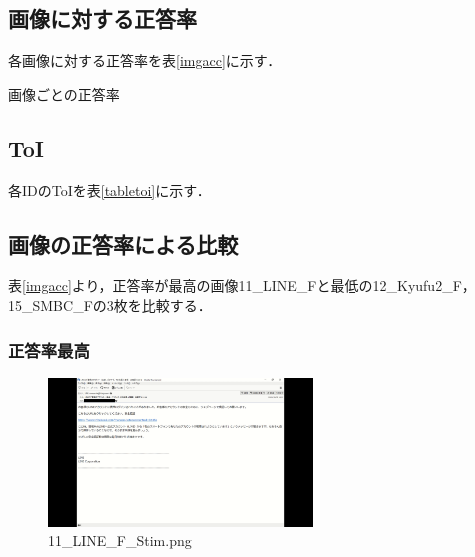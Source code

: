 \documentclass[a4paper,11pt]{ltjsreport}
\begin{document}
\subsection{画像に対する正答率}
各画像に対する正答率を表\ref{imgacc}に示す．
\begin{table}[H]
	\centering
	\caption{画像ごとの正答率\label{imgacc}}
\end{table}

\subsection{ToI}
各IDのToIを表\ref{tabletoi}に示す．
\begin{table}[H]
	\centering
	\caption{Time of Interest\label{tabletoi}}
\end{table}

\subsection{画像の正答率による比較}
\label{sec:imgacccompare}
表\ref{imgacc}より，正答率が最高の画像11\_LINE\_Fと最低の12\_Kyufu2\_F，15\_SMBC\_Fの3枚を比較する．
\subsubsection{正答率最高}
\begin{figure}[H]
	\centering
	\includegraphics[width=7cm]{img/stimuli/11_LINE_F_Stim.png}
	\caption{11\_LINE\_F\_Stim.png}
	\label{fig:a111}
\end{figure}
\end{document}
